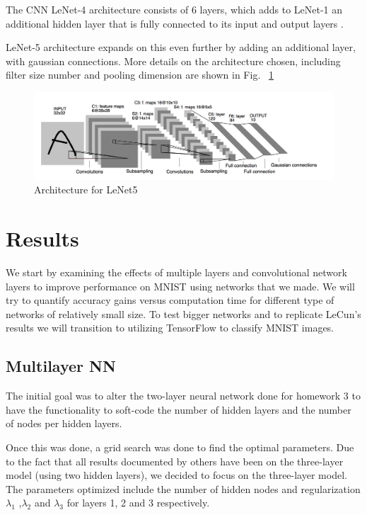 \documentclass[12pt, twocolumn]{article}
\begin{document}
The CNN LeNet-4 architecture consists of 6 layers, which adds to LeNet-1 an additional hidden layer that is fully connected to its  input and output layers  \cite{LeCun95}.

LeNet-5 architecture expands on this even further by adding an additional layer, with gaussian connections. More details on the architecture chosen, including filter size number and pooling dimension are shown in Fig. ~\ref{fig:LeNet5}

 \begin{figure}
\includegraphics[scale=.6]{LeNet5.png}
\caption{Architecture for LeNet5 \cite{LeCun1998}}
\label{fig:LeNet5}
\end{figure}



\section{Results}
We start by examining the effects of multiple layers and convolutional network layers to improve performance on MNIST using networks that we made. We will try to quantify accuracy gains versus computation time for different type of networks of relatively small size. To test bigger networks and to replicate LeCun's results we will transition to utilizing TensorFlow to classify MNIST images. 

\subsection{Multilayer NN}
The initial goal was to alter the two-layer neural network done for homework 3 to have the functionality to soft-code the number of hidden layers and the number of nodes per hidden layers.

Once this was done, a grid search was done to find the optimal parameters. Due to the fact that all results documented by others have been on the three-layer model (using two hidden layers), we decided to focus on the three-layer model. The parameters optimized include the number of hidden nodes and regularization $\lambda_1$ ,$\lambda_2$ and $\lambda_3$ for layers 1, 2 and 3 respectively.
\end{document}
